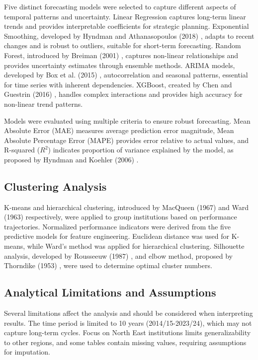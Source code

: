 \documentclass[journal,onecolumn, 10pt,draftclsnofoot]{IEEEtran}
\begin{document}
Five distinct forecasting models were selected to capture different aspects of temporal patterns and uncertainty. Linear Regression captures long-term linear trends and provides interpretable coefficients for strategic planning. Exponential Smoothing, developed by Hyndman and Athanasopoulos (2018) \cite{hyndman2018forecasting}, adapts to recent changes and is robust to outliers, suitable for short-term forecasting. Random Forest, introduced by Breiman (2001) \cite{breiman2001random}, captures non-linear relationships and provides uncertainty estimates through ensemble methods. ARIMA models, developed by Box et al. (2015) \cite{box2015time}, autocorrelation and seasonal patterns, essential for time series with inherent dependencies. XGBoost, created by Chen and Guestrin (2016) \cite{chen2016xgboost}, handles complex interactions and provides high accuracy for non-linear trend patterns.

Models were evaluated using multiple criteria to ensure robust forecasting. Mean Absolute Error (MAE) measures average prediction error magnitude, Mean Absolute Percentage Error (MAPE) provides error relative to actual values, and R-squared ($R^2$) indicates proportion of variance explained by the model, as proposed by Hyndman and Koehler (2006) \cite{hyndman2006another}.

\subsection{Clustering Analysis}

K-means and hierarchical clustering, introduced by MacQueen (1967) \cite{macqueen1967methods} and Ward (1963) \cite{ward1963hierarchical} respectively, were applied to group institutions based on performance trajectories. Normalized performance indicators were derived from the five predictive models for feature engineering. Euclidean distance was used for K-means, while Ward's method was applied for hierarchical clustering. Silhouette analysis, developed by Rousseeuw (1987) \cite{rousseeuw1987silhouettes}, and elbow method, proposed by Thorndike (1953) \cite{thorndike1953belongs}, were used to determine optimal cluster numbers.

\subsection{Analytical Limitations and Assumptions}

Several limitations affect the analysis and should be considered when interpreting results. The time period is limited to 10 years (2014/15-2023/24), which may not capture long-term cycles. Focus on North East institutions limits generalizability to other regions, and some tables contain missing values, requiring assumptions for imputation.
\end{document}
